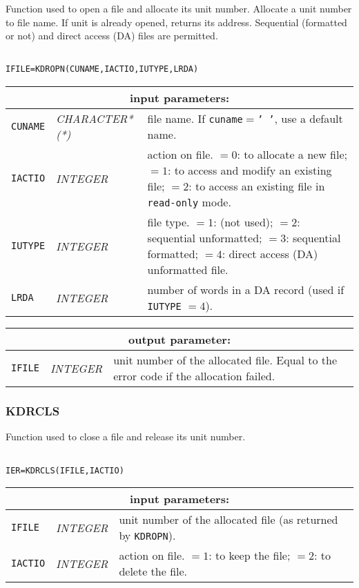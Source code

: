Function used to open a file and allocate its unit number. Allocate a unit number to file
name. If unit is already opened, returns its address. Sequential (formatted
or not) and direct access (DA) files are permitted.

\begin{verbatim}

IFILE=KDROPN(CUNAME,IACTIO,IUTYPE,LRDA)
\end{verbatim}

\noindent
\begin{tabular}{|p{1.5cm}|p{3cm}|p{10cm}|}
\hline
\multicolumn{3}{|c|}{\bf input parameters:} \\
\hline
{\tt CUNAME} & {\it CHARACTER*(*)}  &  file name. If {\tt cuname}$=${\tt ' '}, use a default name. \\
\hline
{\tt IACTIO} & {\it INTEGER}  & action on file.
$=0$: to allocate a new file;
$=1$: to access and modify an existing file;
$=2$: to access an existing file in {\tt read-only} mode.  \\
\hline
{\tt IUTYPE} & {\it INTEGER}  & file type. 
$=1$:  (not used);
$=2$:  sequential unformatted;
$=3$:  sequential formatted;
$=4$:  direct access (DA) unformatted file.  \\
\hline
{\tt LRDA} & {\it INTEGER}  & number of words in a DA record (used if {\tt IUTYPE} $= 4$).  \\
\hline
\end{tabular}

\vskip 0.4cm
\noindent
\begin{tabular}{|p{1.5cm}|p{3cm}|p{10cm}|}
\hline
\multicolumn{3}{|c|}{\bf output parameter:} \\
\hline
{\tt IFILE} & {\it INTEGER}  & unit number of the allocated file. Equal to the error code if the allocation failed.  \\
\hline
\end{tabular}

\subsubsection{KDRCLS}

Function used to close a file and release its unit number.

\begin{verbatim}

IER=KDRCLS(IFILE,IACTIO)
\end{verbatim}

\noindent
\begin{tabular}{|p{1.5cm}|p{3cm}|p{10cm}|}
\hline
\multicolumn{3}{|c|}{\bf input parameters:} \\
\hline
{\tt IFILE} & {\it INTEGER} &  unit number of the allocated file (as returned by {\tt KDROPN}). \\
\hline
{\tt IACTIO} & {\it INTEGER}  & action on file.
$=1$: to keep the file;
$=2$: to delete the file.  \\
\hline
\end{tabular}

